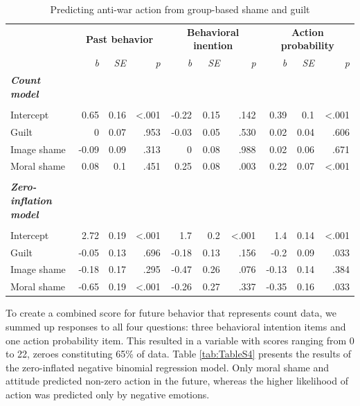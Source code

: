 \documentclass[
]{article}
\begin{document}
\begin{table}[H]
\centering
\caption{\label{tab:TableS3}Predicting anti-war action from group-based shame and guilt}
\centering
\fontsize{8}{10}\selectfont
\begin{tabular}[t]{lrrrrrrrrr}
\toprule
\multicolumn{1}{c}{\textbf{}} & \multicolumn{3}{c}{\textbf{Past behavior}} & \multicolumn{3}{c}{\textbf{Behavioral inention}} & \multicolumn{3}{c}{\textbf{Action probability}} \\
\cmidrule(l{3pt}r{3pt}){2-4} \cmidrule(l{3pt}r{3pt}){5-7} \cmidrule(l{3pt}r{3pt}){8-10}
\em{ } & \em{b} & \em{SE} & \em{p} & \em{b} & \em{SE} & \em{p} & \em{b} & \em{SE} & \em{p}\\
\midrule
\em{\textbf{Count model}} & \em{\textbf{}} & \em{\textbf{}} & \em{\textbf{}} & \em{\textbf{}} & \em{\textbf{}} & \em{\textbf{}} & \em{\textbf{}} & \em{\textbf{}} & \em{\textbf{}}\\
\midrule\\
Intercept & 0.65 & 0.16 & <.001 & -0.22 & 0.15 & .142 & 0.39 & 0.1 & <.001\\
Guilt & 0 & 0.07 & .953 & -0.03 & 0.05 & .530 & 0.02 & 0.04 & .606\\
Image shame & -0.09 & 0.09 & .313 & 0 & 0.08 & .988 & 0.02 & 0.06 & .671\\
Moral shame & 0.08 & 0.1 & .451 & 0.25 & 0.08 & .003 & 0.22 & 0.07 & <.001\\
\midrule\\
\addlinespace
\em{\textbf{Zero-inflation model}} & \em{\textbf{}} & \em{\textbf{}} & \em{\textbf{}} & \em{\textbf{}} & \em{\textbf{}} & \em{\textbf{}} & \em{\textbf{}} & \em{\textbf{}} & \em{\textbf{}}\\
\midrule\\
Intercept & 2.72 & 0.19 & <.001 & 1.7 & 0.2 & <.001 & 1.4 & 0.14 & <.001\\
Guilt & -0.05 & 0.13 & .696 & -0.18 & 0.13 & .156 & -0.2 & 0.09 & .033\\
Image shame & -0.18 & 0.17 & .295 & -0.47 & 0.26 & .076 & -0.13 & 0.14 & .384\\
Moral shame & -0.65 & 0.19 & <.001 & -0.26 & 0.27 & .337 & -0.35 & 0.16 & .033\\
\bottomrule
\end{tabular}
\end{table}

To create a combined score for future behavior that represents count data, we summed up responses to all four questions: three behavioral intention items and one action probability item. This resulted in a variable with scores ranging from 0 to 22, zeroes constituting 65\% of data. Table \ref{tab:TableS4} presents the results of the zero-inflated negative binomial regression model. Only moral shame and attitude predicted non-zero action in the future, whereas the higher likelihood of action was predicted only by negative emotions.
\end{document}
